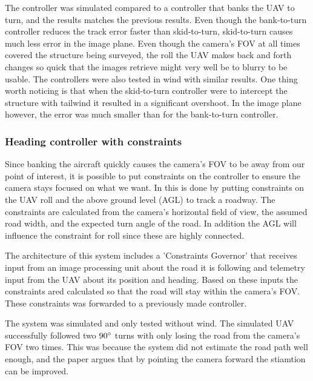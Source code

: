 The controller was simulated compared to a controller that banks the UAV to turn, and the results matches the previous results. Even though the bank-to-turn controller reduces the track error faster than skid-to-turn, skid-to-turn causes much less error in the image plane. Even though the camera's FOV at all times covered the structure being surveyed, the roll the UAV makes back and forth changes so quick that the images retrieve might very well be to blurry to be usable. The controllers were also tested in wind with similar results. One thing worth noticing is that when the skid-to-turn controller were to intercept the structure with tailwind it resulted in a significant overshoot. In the image plane however, the error was much smaller than for the bank-to-turn controller.


\subsubsection{Heading controller with constraints}
Since banking the aircraft quickly causes the camera's FOV to be away from our point of interest, it is possible to put constraints on the controller to ensure the camera stays focused on what we want. In \cite{constraintsEGBERT} this is done by putting constraints on the UAV roll and the above ground level (AGL) to track a roadway. The constraints are calculated from the camera's horizontal field of view, the assumed road width, and the expected turn angle of the road. In addition the AGL will influence the constraint for roll since these are highly connected.

The architecture of this system includes a 'Constraints Governor' that receives input from an image processing unit about the road it is following and telemetry input from the UAV about its position and heading. Based on these inputs the constraints ared calculated so that the road will stay within the camera's FOV. These constraints was forwarded to a previously made controller.

The system was simulated and only tested without wind. The simulated UAV successfully followed two $90 \degree$ turns with only losing the road from the camera's FOV two times. This was because the system did not estimate the road path well enough, and the paper argues that by pointing the camera forward the stiamtion can be improved.